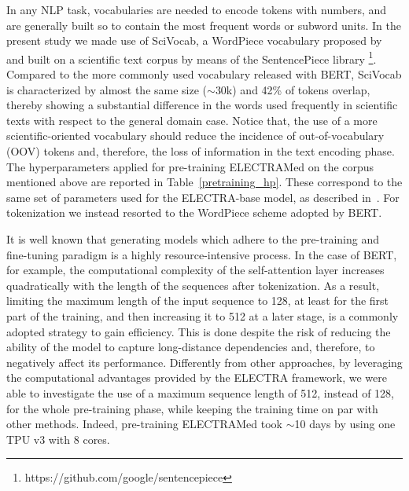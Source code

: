 \documentclass{article}
\begin{document}
In any NLP task, vocabularies are needed to encode tokens with numbers, and are generally built so to contain the most frequent words or subword units.
In the present study we made use of SciVocab, a WordPiece vocabulary proposed by \citep{Beltagy19} and built on a scientific text corpus by means of the SentencePiece library \footnote{https://github.com/google/sentencepiece}. 
Compared to the more commonly used vocabulary released with BERT, SciVocab is characterized by almost the same size ($\sim$30k) and 42\% of tokens overlap, thereby showing a substantial difference in the words used frequently in scientific texts with respect to the general domain case.
Notice that, the use of a more scientific-oriented vocabulary should reduce the incidence of out-of-vocabulary (OOV) tokens and, therefore, the loss of information in the text encoding phase.
The hyperparameters applied for pre-training ELECTRAMed on the corpus mentioned above are reported in Table~\ref{pretraining_hp}.
These correspond to the same set of parameters used for the ELECTRA-base model, as described in~\citep{Clark20}.
For tokenization we instead resorted to the WordPiece scheme adopted by BERT.

It is well known that generating models which adhere to the pre-training and fine-tuning paradigm is a highly resource-intensive process. 
In the case of BERT, for example, the computational complexity of the self-attention layer increases quadratically with the length of the sequences after tokenization.
As a result, limiting the maximum length of the input sequence to 128, at least for the first part of the training, and then increasing it to 512 at a later stage, is a commonly adopted strategy to gain efficiency.
This is done despite the risk of reducing the ability of the model to capture long-distance dependencies and, therefore, to negatively affect its performance.
Differently from other approaches, by leveraging the computational advantages provided by the ELECTRA framework, we were able to investigate the use of a maximum sequence length of 512, instead of 128, for the whole pre-training phase, while keeping the training time on par with other methods.
Indeed, pre-training ELECTRAMed took $\sim$10 days by using one TPU v3 with 8 cores.
\end{document}
